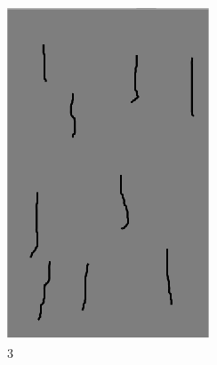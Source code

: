 \documentclass[a4paper,12pt,fleqn,twoside,openany]{book}
\begin{document}
\begin{figure}
\begin{subfigure}{0.2\textwidth}
        \includegraphics[width=\textwidth]{Img/Resultados/Resistencia/EsponjaR2.eps}
        \caption{3}%
        \label{fig: EspR2}
    \end{subfigure}
        \begin{subfigure}{0.2\textwidth}

\end{subfigure}
\end{figure}
\end{document}
